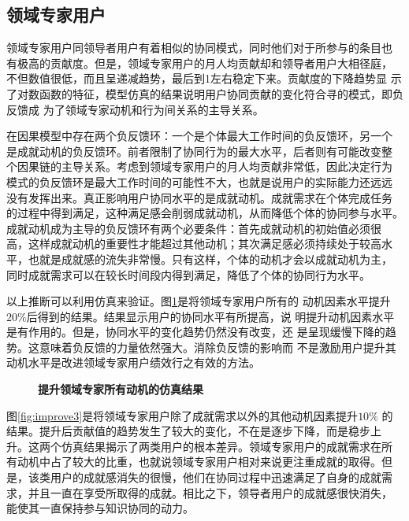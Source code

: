 \subsection{领域专家用户}
领域专家用户同领导者用户有着相似的协同模式，同时他们对于所参与的条目也
有极高的贡献度。但是，领域专家用户的月人均贡献却和领导者用户大相径庭，
不但数值很低，而且呈递减趋势，最后到1左右稳定下来。贡献度的下降趋势显
示了对数函数的特征，模型仿真的结果说明用户协同贡献的变化符合寻的模式，即负反馈成
为了领域专家动机和行为间关系的主导关系。

在因果模型中存在两个负反馈环：一个是个体最大工作时间的负反馈环，另一个
是成就动机的负反馈环。前者限制了协同行为的最大水平，后者则有可能改变整
个因果链的主导关系。考虑到领域专家用户的月人均贡献非常低，因此决定行为
模式的负反馈环是最大工作时间的可能性不大，也就是说用户的实际能力还远远
没有发挥出来。真正影响用户协同水平的是成就动机。成就需求在个体完成任务
的过程中得到满足，这种满足感会削弱成就动机，从而降低个体的协同参与水平。
成就动机成为主导的负反馈环有两个必要条件：首先成就动机的初始值必须很
高，这样成就动机的重要性才能超过其他动机；其次满足感必须持续处于较高水
平，也就是成就感的流失非常慢。只有这样，个体的动机才会以成就动机为主，
同时成就需求可以在较长时间段内得到满足，降低了个体的协同行为水平。 

以上推断可以利用仿真来验证。图\ref{fig:improve4}是将领域专家用户所有的
动机因素水平提升$20\%$后得到的结果。结果显示用户的协同水平有所提高，说
明提升动机因素水平是有作用的。但是，协同水平的变化趋势仍然没有改变，还
是呈现缓慢下降的趋势。这意味着负反馈的力量依然强大。消除负反馈的影响而
不是激励用户提升其动机水平是改进领域专家用户绩效行之有效的方法。
\begin{figure}[!htb]
  \centering
   
 \caption{\small{\textbf{提升领域专家所有动机的仿真结果}}}
  \label{fig:improve4}
\end{figure}

图\ref{fig:improve3}是将领域专家用户除了成就需求以外的其他动机因素提升$10\%$
的结果。提升后贡献值的趋势发生了较大的变化，不在是逐步下降，而是稳步上
升。这两个仿真结果揭示了两类用户的根本差异。领域专家用户的成就需求在所
有动机中占了较大的比重，也就说领域专家用户相对来说更注重成就的取得。但
是，该类用户的成就感消失的很慢，他们在协同过程中迅速满足了自身的成就需
求，并且一直在享受所取得的成就。相比之下，领导者用户的成就感很快消失，
能使其一直保持参与知识协同的动力。

